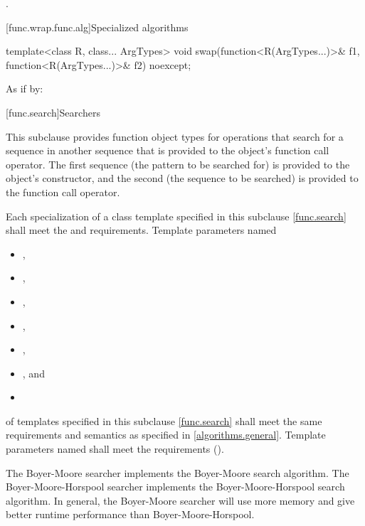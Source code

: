 \begin{itemdescr}
\pnum
\returns
{}.
\end{itemdescr}

[func.wrap.func.alg]{Specialized algorithms}

%
\begin{itemdecl}
template<class R, class... ArgTypes>
  void swap(function<R(ArgTypes...)>& f1, function<R(ArgTypes...)>& f2) noexcept;
\end{itemdecl}

\begin{itemdescr}
\pnum
\effects
As if by: 
\end{itemdescr}%

[func.search]{Searchers}

\pnum
This subclause provides function object types for
operations that search for a sequence  in another
sequence  that is provided to the object's function call
operator.  The first sequence (the pattern to be searched for) is provided to
the object's constructor, and the second (the sequence to be searched) is
provided to the function call operator.

\pnum
Each specialization of a class template specified in this subclause \ref{func.search}
shall meet the  and  requirements.
Template parameters named
\begin{itemize}
\item {},
\item {},
\item {},
\item {},
\item {},
\item {}, and
\item {}
\end{itemize}
of templates specified in this subclause
\ref{func.search} shall meet the same requirements and semantics as
specified in \ref{algorithms.general}.
Template parameters named  shall meet the 
requirements ().

\pnum
The Boyer-Moore searcher implements the Boyer-Moore search algorithm.
The Boyer-Moore-Horspool searcher implements the Boyer-Moore-Horspool search algorithm.
In general, the Boyer-Moore searcher will use more memory and give better runtime performance than Boyer-Moore-Horspool.

